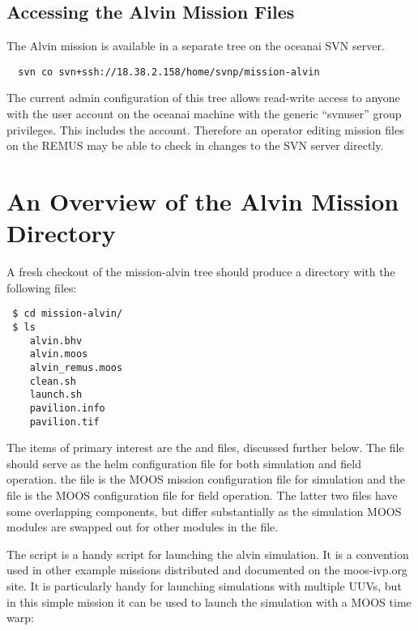 \subsection{Accessing the Alvin Mission Files}

The Alvin mission is available in a separate tree on the oceanai SVN
server.

\footnotesize
\begin{verbatim}
  svn co svn+ssh://18.38.2.158/home/svnp/mission-alvin
\end{verbatim}
\normalsize

\noindent
The current admin configuration of this tree allows read-write
access to anyone with the user account on the oceanai machine with 
the generic ``svnuser'' group privileges. This includes the 
account. Therefore an operator editing mission files on the REMUS
may be able to check in changes to the SVN server directly.

\section{An Overview of the Alvin Mission Directory}

A fresh checkout of the mission-alvin tree should produce a directory
with the following files:

\footnotesize
\begin{verbatim}
 $ cd mission-alvin/
 $ ls
    alvin.bhv
    alvin.moos
    alvin_remus.moos
    clean.sh
    launch.sh
    pavilion.info
    pavilion.tif
\end{verbatim}
\normalsize

\noindent 
The items of primary interest are the  and 
files, discussed further below. The  file should serve
as the helm configuration file for both simulation and field
operation.  the  file is the MOOS mission
configuration file for simulation and the  file
is the MOOS configuration file for field operation. The latter two
files have some overlapping components, but differ substantially as
the simulation MOOS modules are swapped out for other modules in the
 file.

\pskip

The  script is a handy script for launching the alvin
simulation. It is a convention used in other example missions distributed
and documented on the moos-ivp.org site. It is particularly handy for 
launching simulations with multiple UUVs, but in this simple mission
it can be used to launch the simulation with a MOOS time warp:

